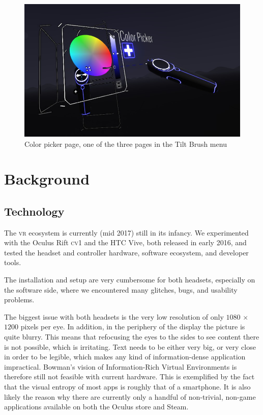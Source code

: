 \documentclass{tufte-book} %
\begin{document}
\begin{figure}
  \includegraphics{tiltbrushmenu.png}
  \caption{Color picker page, one of the three pages in the Tilt Brush menu}
  \label{fig:tiltbrush}
\end{figure}



\chapter{Background}
\label{ch:background}

\section{Technology}
The \textsc{vr} ecosystem is currently (mid 2017) still in its infancy. We experimented with the Oculus Rift \textsc{cv1} and the \textsc{HTC} Vive, both released in early 2016, and tested the headset and controller hardware, software ecosystem, and developer tools.

The installation and setup are very cumbersome for both headsets, especially on the software side, where we encountered many glitches, bugs, and usability problems.

The biggest issue with both headsets is the very low resolution of only $1080$ $\times$ $1200$ pixels per eye. In addition, in the periphery of the display the picture is quite blurry. This means that refocusing the eyes to the sides to see content there is not possible, which is irritating. Text needs to be either very big, or very close in order to be legible, which makes any kind of information-dense application impractical. Bowman's vision of Information-Rich Virtual Environments \cite{bowman2003information} is therefore still not feasible with current hardware. This is exemplified by the fact that the visual entropy of most apps is roughly that of a smartphone. It is also likely the reason why there are currently only a handful of non-trivial, non-game applications available on both the Oculus store and Steam.
\end{document}
